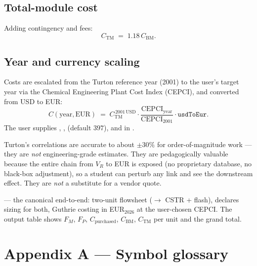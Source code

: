 \documentclass[11pt,a4paper]{article}
\begin{document}
\subsection{Total-module cost}

Adding contingency and fees:
\begin{equation}
   C_{\mathrm{TM}} \;=\; 1.18 \, C_{\mathrm{BM}}.
\end{equation}

\subsection{Year and currency scaling}

Costs are escalated from the Turton reference year (2001) to the user's
target year via the Chemical Engineering Plant Cost Index (CEPCI),
and converted from USD to EUR:
\begin{equation}
   C(\mathrm{year}, \mathrm{EUR})
   \;=\; C_{\mathrm{TM}}^{\,2001\,\mathrm{USD}}
   \cdot \frac{\mathrm{CEPCI}_{\mathrm{year}}}{\mathrm{CEPCI}_{2001}}
   \cdot \texttt{usdToEur}.
\end{equation}
The user supplies , ,  (default
$397$), and  in .

\begin{pitfall}
Turton's correlations are accurate to about $\pm 30\%$ for
order-of-magnitude work --- they are \emph{not} engineering-grade
estimates. They are pedagogically valuable because the entire chain
from $V_R$ to EUR is exposed (no proprietary database, no black-box
adjustment), so a student can perturb any link and see the downstream
effect. They are \emph{not} a substitute for a vendor quote.
\end{pitfall}

\begin{tutoriallink}
 --- the canonical end-to-end:
two-unit flowsheet ($\to$ CSTR + flash),  declares
sizing for both, Guthrie costing in EUR$_{2026}$ at the user-chosen
CEPCI. The output table shows $F_M$, $F_P$, $C_{\mathrm{purchased}}$,
$C_{\mathrm{BM}}$, $C_{\mathrm{TM}}$ per unit and the grand total.
\end{tutoriallink}

\clearpage
\section*{Appendix A --- Symbol glossary}
{}
\end{document}

